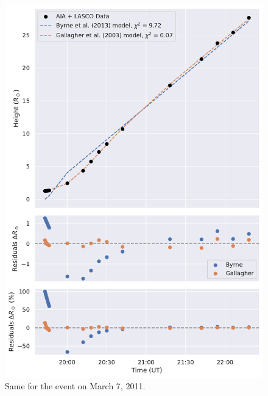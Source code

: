 \begin{figure}[!htp]
	\centering
	\includegraphics[width=0.8\hsize]{chapter2/figs/appendix/height_profile_residuals_aia_lasco_110307_02.pdf}
	\caption{Same for the event on March 7, 2011.}
\end{figure}

